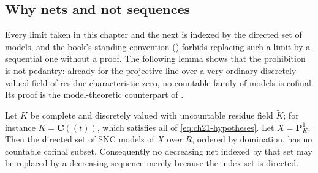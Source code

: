 \subsection{Why nets and not sequences}
\label{sec:ch21-nets}

Every limit taken in this chapter and the next is indexed by the directed
set of models, and the book's standing convention
() forbids replacing such a limit by a
sequential one without a proof.  The following lemma shows that the
prohibition is not pedantry: already for the projective line over a very
ordinary discretely valued field of residue characteristic zero, no
countable family of models is cofinal.  Its proof is the model-theoretic
counterpart of .

\begin{lemma}
\label{lem:ch21-no-cofinal-sequence}
Let $K$ be complete and discretely valued with uncountable residue field
$\widetilde K$; for instance $K=\mathbf C((t))$, which satisfies all of
\eqref{eq:ch21-hypotheses}.  Let $X=\mathbf P^1_K$.  Then the directed set
of SNC models of $X$ over $R$, ordered by domination, has no countable
cofinal subset.  Consequently no decreasing net indexed by that set may be
replaced by a decreasing sequence merely because the index set is directed.
\end{lemma}

